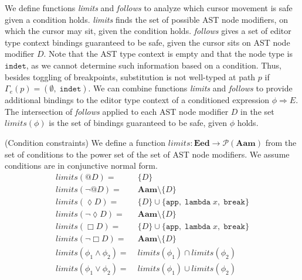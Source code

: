 We define functions \textit{limits} and \textit{follows} to analyze which cursor movement is safe given a condition holds. \textit{limits} finds the set of possible AST node modifiers, on which the cursor may sit, given the condition holds. \textit{follows} gives a set of editor type context bindings guaranteed to be safe, given the cursor sits on AST node modifier $D$. Note that the AST type context is empty and that the node type is $\texttt{indet}$, as we cannot determine such information based on a condition. Thus, besides toggling of breakpoints, substitution is not well-typed at path $p$ if $\Gamma_e(p)=(\emptyset,\; \texttt{indet})$. We can combine functions \textit{limits} and \textit{follows} to provide additional bindings to the editor type context of a conditioned expression $\phi \Rightarrow E$. The intersection of \textit{follows} applied to each AST node modifier $D$ in the set $limits(\phi)$ is the set of bindings guaranteed to be safe, given $\phi$ holds.

\theoremstyle{definition}
\begin{definition}{(Condition constraints)}
We define a function $limits: \mathbf{Eed} \rightarrow \mathcal{P}(\mathbf{Aam})$ from the set of conditions to the power set of the set of AST node modifiers. We assume conditions are in conjunctive normal form.
\begin{align*}
    limits(@D)=&\;\{D\}\\
    limits(\neg @D)=&\;\mathbf{Aam}\setminus \{D\}\\
    limits(\lozenge D)=&\;\{D\} \cup \{\texttt{app},\; \texttt{lambda}\; x,\; \texttt{break}\}\\
    limits(\neg \lozenge D)=&\;\mathbf{Aam}\setminus \{D\}\\
    limits(\Box D)=&\;\{D\} \cup \{\texttt{app},\; \texttt{lambda}\; x,\; \texttt{break}\}\\
    limits(\neg \Box D)=&\;\mathbf{Aam}\setminus \{D\}\\
    limits(\phi_1 \land \phi_2)=&\;limits(\phi_1) \cap limits(\phi_2)\\
    limits(\phi_1 \lor \phi_2)=&\;limits(\phi_1) \cup limits(\phi_2)
\end{align*}
\end{definition}


